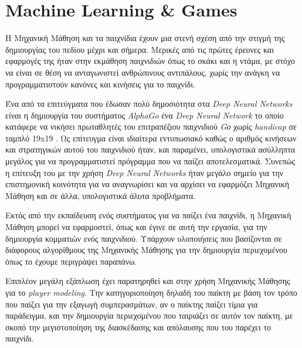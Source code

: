 \section{Machine Learning \& Games}
Η Μηχανική Μάθηση και τα παιχνίδια έχουν μια στενή σχέση από την στιγμή της δημιουργίας του πεδίου μέχρι και σήμερα. Μερικές από τις πρώτες έρευνες και εφαρμογές της ήταν στην εκμάθηση παιχνιδιών όπως το σκάκι και η ντάμα, με στόχο να είναι σε θέση να ανταγωνιστεί ανθρώπινους αντιπάλους, χωρίς την ανάγκη να προγραμματιστούν κανόνες και κινήσεις για το παιχνίδι.
\par
Ένα από τα επιτεύγματα που έδωσαν πολύ δημοσιότητα στα \textit{Deep Neural Networks} είναι η δημιουργία του συστήματος \textit{AlphaGo} ένα \textit{Deep Neural Network} το οποίο κατάφερε να νικήσει πρωταθλητές του επιτραπέζιου παιχνιδιού \textit{Gο} χωρίς \textit{handicap} σε ταμπλό 19x19 \cite{alphago}. Ως επίτευγμα είναι ιδιαίτερα εντυπωσιακό καθώς ο αριθμός κινήσεων και στρατηγικών αυτού του παιχνιδιού ήταν, και παραμένει, υπολογιστικά ασύλληπτα μεγάλος για να προγραμματιστεί πρόγραμμα που να παίζει αποτελεσματικά. Συνεπώς η επίτευξη του με την χρήση \textit{Deep Neural Networks} ήταν μεγάλο σημείο για την επιστημονική κοινότητα για να αναγνωρίσει και να αρχίσει να εφαρμόζει Μηχανική Μάθηση και σε άλλα, υπολογιστικά άλυτα προβλήματα.
\par
Εκτός από την εκπαίδευση ενός συστήματος για να παίζει ένα παιχνίδι, η Μηχανική Μάθηση μπορεί να εφαρμοστεί, όπως και έγινε σε αυτή την εργασία, για την δημιουργία κομματιών ενός παιχνιδιού. Υπάρχουν υλοποιήσεις που βασίζονται σε διάφορους αλγορίθμους της Μηχανικής Μάθησης για την δημιουργία περιεχομένου όπως το έχουμε περιγράψει παραπάνω.
\par
Επιπλέον μεγάλη εξάπλωση έχει παρατηρηθεί και στην χρήση Μηχανικής Μάθησης για το \textit{player modeling}. Την κατηγοριοποίηση δηλαδή του παίκτη με βάση τον τρόπο που παίζει για την εξαγωγή συμπερασμάτων, αν ο παίκτης παίζει τίμια για παράδειγμα, και την δημιουργία περιεχομένου που ταιριάζει σε αυτόν τον παίκτη, με σκοπό την μεγιστοποίηση της διασκέδασης και απόλαυσης που του παρέχει το παιχνίδι. 


